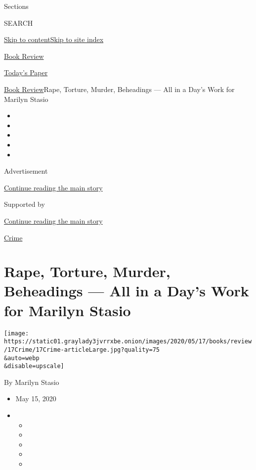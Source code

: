 Sections

SEARCH

\protect\hyperlink{site-content}{Skip to
content}\protect\hyperlink{site-index}{Skip to site index}

\href{https://www.nytimes3xbfgragh.onion/section/books/review}{Book
Review}

\href{https://myaccount.nytimes3xbfgragh.onion/auth/login?response_type=cookie\&client_id=vi}{}

\href{https://www.nytimes3xbfgragh.onion/section/todayspaper}{Today's
Paper}

\href{/section/books/review}{Book Review}\textbar{}Rape, Torture,
Murder, Beheadings --- All in a Day's Work for Marilyn Stasio

\begin{itemize}
\item
\item
\item
\item
\item
\end{itemize}

Advertisement

\protect\hyperlink{after-top}{Continue reading the main story}

Supported by

\protect\hyperlink{after-sponsor}{Continue reading the main story}

\href{/column/crime}{Crime}

\hypertarget{rape-torture-murder-beheadings--all-in-a-days-work-for-marilyn-stasio}{%
\section{Rape, Torture, Murder, Beheadings --- All in a Day's Work for
Marilyn
Stasio}\label{rape-torture-murder-beheadings--all-in-a-days-work-for-marilyn-stasio}}

\texttt{[image: https://static01.graylady3jvrrxbe.onion/images/2020/05/17/books/review/17Crime/17Crime-articleLarge.jpg?quality=75\\\&auto=webp\\\&disable=upscale]}

By Marilyn Stasio

\begin{itemize}
\item
  May 15, 2020
\item
  \begin{itemize}
  \item
  \item
  \item
  \item
  \item
  \end{itemize}
\end{itemize}

